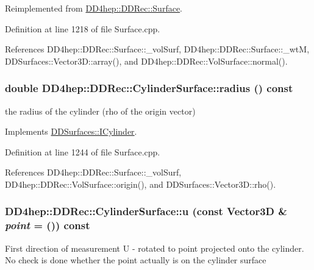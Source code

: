 Reimplemented from \hyperlink{class_d_d4hep_1_1_d_d_rec_1_1_surface_a1a4f7412be6079af165bb7a3b3e7770c}{DD4hep::DDRec::Surface}.

Definition at line 1218 of file Surface.cpp.

References DD4hep::DDRec::Surface::\_\-volSurf, DD4hep::DDRec::Surface::\_\-wtM, DDSurfaces::Vector3D::array(), and DD4hep::DDRec::VolSurface::normal().\hypertarget{class_d_d4hep_1_1_d_d_rec_1_1_cylinder_surface_ad07737fba21e42e21d521ce9dba2083b}{
\subsubsection[{radius}]{\setlength{\rightskip}{0pt plus 5cm}double DD4hep::DDRec::CylinderSurface::radius () const}}
\label{class_d_d4hep_1_1_d_d_rec_1_1_cylinder_surface_ad07737fba21e42e21d521ce9dba2083b}


the radius of the cylinder (rho of the origin vector) 

Implements \hyperlink{class_d_d_surfaces_1_1_i_cylinder_a66bc9b90cdb121938eff646b2fd21385}{DDSurfaces::ICylinder}.

Definition at line 1244 of file Surface.cpp.

References DD4hep::DDRec::Surface::\_\-volSurf, DD4hep::DDRec::VolSurface::origin(), and DDSurfaces::Vector3D::rho().\hypertarget{class_d_d4hep_1_1_d_d_rec_1_1_cylinder_surface_adb01b4c563ea150f1c2a4d595beca0e6}{
\subsubsection[{u}]{ DD4hep::DDRec::CylinderSurface::u (const {\bf Vector3D} \& {\em point} = {()}) const}}
\label{class_d_d4hep_1_1_d_d_rec_1_1_cylinder_surface_adb01b4c563ea150f1c2a4d595beca0e6}
First direction of measurement U -\/ rotated to point projected onto the cylinder. No check is done whether the point actually is on the cylinder surface 

